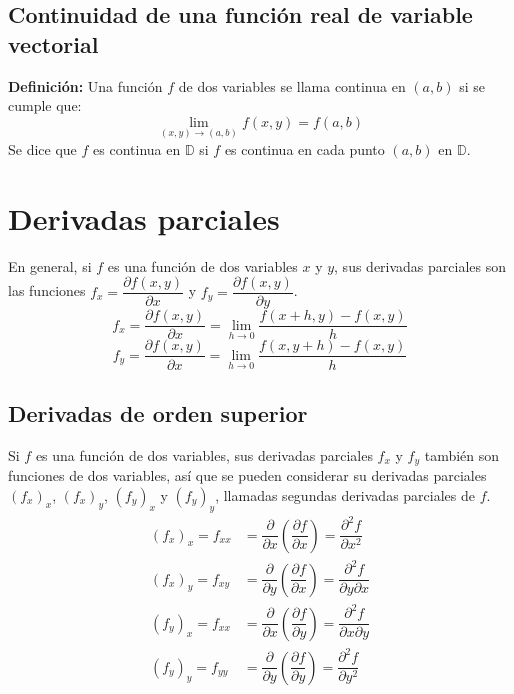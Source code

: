 \documentclass[../main]{subfiles}
\begin{document}
\section{Continuidad de una función real de variable vectorial}
\textbf{Definición:} Una función $f$ de dos variables se llama continua en $(a,b)$ si se cumple que:
\begin{equation}
   \lim_{(x,y) \rightarrow (a,b)} f(x,y)=f(a,b) 
\end{equation}
Se dice que $f$ es continua en $\mathbb{D}$ si $f$ es continua en cada punto $(a,b)$ en $\mathbb{D}$.
\chapter{Derivadas parciales}
En general, si $f$ es una función de dos variables $x$ y $y$, sus derivadas parciales son las funciones $f_x=\dfrac{\partial f(x,y)}{\partial x}$ y $f_y=\dfrac{\partial f(x,y)}{\partial y}$.
\begin{equation}
    f_x=\dfrac{\partial f(x,y)}{\partial x}=\lim_{h \rightarrow 0} \dfrac{f(x+h,y)-f(x,y)}{h}
\end{equation}
\begin{equation}
    f_y=\dfrac{\partial f(x,y)}{\partial x}=\lim_{h \rightarrow 0} \dfrac{f(x,y+h)-f(x,y)}{h}
\end{equation}
\section{Derivadas de orden superior}
Si $f$ es una función de dos variables, sus derivadas parciales $f_x$ y $f_y$ también son funciones de dos variables, así que se pueden considerar su derivadas parciales $(f_x)_x$, $(f_x)_y$, $(f_y)_x$ y $(f_y)_y$, llamadas segundas derivadas parciales de $f$.
\begin{align}
(f_x)_x=f_{xx}&=\dfrac{\partial}{\partial x} \left ( \dfrac{\partial f}{\partial x} \right)=\dfrac{\partial^2 f}{\partial x^2} \\
(f_x)_y=f_{xy}&=\dfrac{\partial}{\partial y} \left ( \dfrac{\partial f}{\partial x} \right)=\dfrac{\partial^2 f}{\partial y \partial x} \\
(f_y)_x=f_{xx}&=\dfrac{\partial}{\partial x} \left ( \dfrac{\partial f}{\partial y} \right)=\dfrac{\partial^2 f}{\partial x \partial y} \\
(f_y)_y=f_{yy}&=\dfrac{\partial}{\partial y} \left ( \dfrac{\partial f}{\partial y} \right)=\dfrac{\partial^2 f}{\partial y^2}
\end{align}
\end{document}
